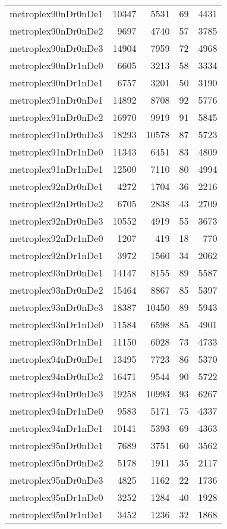 \begin{longtable}{lrrrr}
metroplex90nDr0nDe1 & 10347 & 5531 & 69 & 4431 \\
metroplex90nDr0nDe2 & 9697 & 4740 & 57 & 3785 \\
metroplex90nDr0nDe3 & 14904 & 7959 & 72 & 4968 \\
metroplex90nDr1nDe0 & 6605 & 3213 & 58 & 3334 \\
metroplex90nDr1nDe1 & 6757 & 3201 & 50 & 3190 \\
metroplex91nDr0nDe1 & 14892 & 8708 & 92 & 5776 \\
metroplex91nDr0nDe2 & 16970 & 9919 & 91 & 5845 \\
metroplex91nDr0nDe3 & 18293 & 10578 & 87 & 5723 \\
metroplex91nDr1nDe0 & 11343 & 6451 & 83 & 4809 \\
metroplex91nDr1nDe1 & 12500 & 7110 & 80 & 4994 \\
metroplex92nDr0nDe1 & 4272 & 1704 & 36 & 2216 \\
metroplex92nDr0nDe2 & 6705 & 2838 & 43 & 2709 \\
metroplex92nDr0nDe3 & 10552 & 4919 & 55 & 3673 \\
metroplex92nDr1nDe0 & 1207 & 419 & 18 & 770 \\
metroplex92nDr1nDe1 & 3972 & 1560 & 34 & 2062 \\
metroplex93nDr0nDe1 & 14147 & 8155 & 89 & 5587 \\
metroplex93nDr0nDe2 & 15464 & 8867 & 85 & 5397 \\
metroplex93nDr0nDe3 & 18387 & 10450 & 89 & 5943 \\
metroplex93nDr1nDe0 & 11584 & 6598 & 85 & 4901 \\
metroplex93nDr1nDe1 & 11150 & 6028 & 73 & 4733 \\
metroplex94nDr0nDe1 & 13495 & 7723 & 86 & 5370 \\
metroplex94nDr0nDe2 & 16471 & 9544 & 90 & 5722 \\
metroplex94nDr0nDe3 & 19258 & 10993 & 93 & 6267 \\
metroplex94nDr1nDe0 & 9583 & 5171 & 75 & 4337 \\
metroplex94nDr1nDe1 & 10141 & 5393 & 69 & 4363 \\
metroplex95nDr0nDe1 & 7689 & 3751 & 60 & 3562 \\
metroplex95nDr0nDe2 & 5178 & 1911 & 35 & 2117 \\
metroplex95nDr0nDe3 & 4825 & 1162 & 22 & 1736 \\
metroplex95nDr1nDe0 & 3252 & 1284 & 40 & 1928 \\
metroplex95nDr1nDe1 & 3452 & 1236 & 32 & 1868 \\

\end{longtable}
